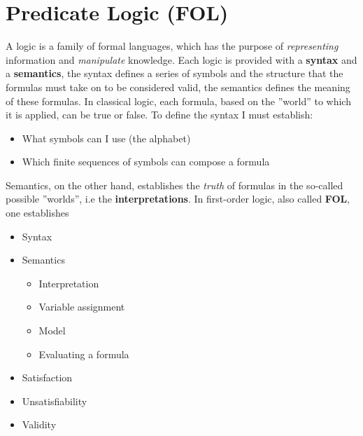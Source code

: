 \documentclass[10pt, letterpaper]{report}
\begin{document}
 \section{Predicate Logic (FOL)}
A logic is a family of formal languages, which has the purpose of \textit{representing} information and 
\textit{manipulate} knowledge. Each logic is provided with a \textbf{syntax} and a \textbf{semantics}, the syntax 
defines a series of symbols and the structure that the formulas must take on to be considered valid, the semantics 
defines the meaning of these formulas.\acc 
In classical logic, each formula, based on the ''world'' to which it is applied, can be true or false. 
To define the syntax I must establish:\begin{itemize}
    \item What symbols can I use (the alphabet)
    \item Which finite sequences of symbols can compose a formula
\end{itemize}
Semantics, on the other hand, establishes the \textit{truth} of formulas in the so-called possible ''worlds'', i.e 
the \textbf{interpretations}. In first-order logic, also called \textbf{FOL}, one establishes\begin{itemize}
    \item Syntax 
    \item Semantics \begin{itemize}
        \item Interpretation 
        \item Variable assignment 
        \item Model 
        \item Evaluating a formula 
    \end{itemize}
    \item Satisfaction 
    \item Unsatisfiability
    \item Validity
\end{itemize}
\end{document}
